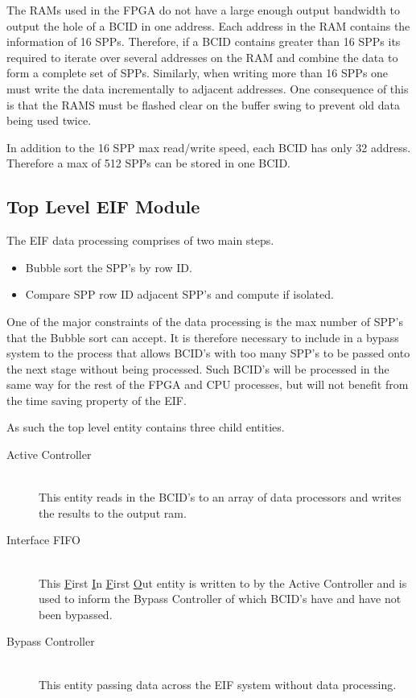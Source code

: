 			The RAMs used in the FPGA do not have a large enough output bandwidth to output the hole of a BCID in one address.
			Each address in the RAM contains the information of 16 SPPs.
			Therefore, if a BCID contains greater than 16 SPPs its required to iterate over several addresses on the RAM and combine the data to form a complete set of SPPs.
			Similarly, when writing more than 16 SPPs one must write the data incrementally to adjacent addresses.
			One consequence of this is that the RAMS must be flashed clear on the buffer swing to prevent old data being used twice.

			In addition to the 16 SPP max read/write speed, each BCID has only 32 address.
			Therefore a max of 512 SPPs can be stored in one BCID.

	

	\subsection{Top Level EIF Module} %
	\label{sub:top_level_processing}
	
		The EIF data processing comprises of two main steps.

		\begin{itemize}
			\item Bubble sort the SPP's by row ID.
			\item Compare SPP row ID adjacent SPP's and compute if isolated. 
		\end{itemize}

		One of the major constraints of the data processing is the max number of SPP's that the Bubble sort can accept.
		It is therefore necessary to include in a bypass system to the process that allows BCID's with too many SPP's to be passed onto the next stage without being processed.
		Such BCID's will be processed in the same way for the rest of the FPGA and CPU processes, but will not benefit from the time saving property of the EIF.

		As such the top level entity contains three child entities.

		\begin{description}
			\item[Active Controller] \hfill \\
				This entity reads in the BCID's to an array of data processors and writes the results to the output ram.
			\item[Interface FIFO] \hfill \\
				This \underline{F}irst \underline{I}n \underline{F}irst \underline{O}ut entity is written to by the Active Controller and is used to inform the Bypass Controller of which BCID's have and have not been bypassed.
			\item[Bypass Controller] \hfill \\
				This entity passing data across the EIF system without data processing.
		\end{description}

